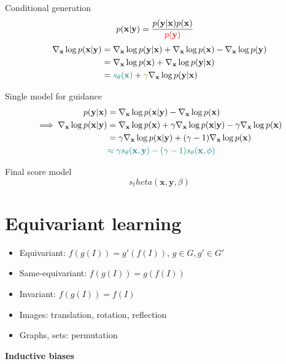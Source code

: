 \documentclass[aspectratio=169,xcolor=dvipsnames]{beamer}
\newcommand{\bx}{\mathbf{x}}
\newcommand{\by}{\mathbf{y}}
\newcommand{\nbx}{\nabla_{\bx}}
\begin{document}
\begin{frame}{Conditional generation}
  \begin{align*}
   p(\bx | \by) &= \frac{p(\by | \bx) p(\bx)}{\textcolor{red}{p(\by)}}
  \end{align*}
  \pause
  \begin{align*}
    \nbx \log p(\bx | \by) &= \nbx \log p(\by | \bx) + \nbx \log p(\bx) - \nbx \log p(\by)\\
                           &= \nbx \log p(\bx) + \nbx \log p(\by | \bx) \\
                           &= \textcolor{teal}{s_\theta(\bx)} + \textcolor{olive}{\gamma} \nbx \log p(\by | \bx)
  \end{align*}
\end{frame}

\begin{frame}{Single model for guidance}
  \begin{align*}
    p(\by | \bx) &= \nbx \log p(\bx | \by) - \nbx \log p(\bx)\\
    \implies  \nbx \log p(\bx | \by) &= \nbx \log p(\bx) + \gamma \nbx \log p(\bx | \by) - \gamma \nbx \log p(\bx) \\
                                     &= \gamma \nbx \log p(\bx | \by) + (\gamma - 1)  \nbx \log p(\bx)\\
                                     &\textcolor{teal}{\approx \gamma s_\theta(\bx, \by) - (\gamma - 1) s_\theta(\bx, \phi)}
  \end{align*}
\end{frame}

\begin{frame}{Final score model}
  \[
  s_theta(\bx, \by, \beta)
  \]
\end{frame}

\section{Equivariant learning}
\begin{frame}{}
  \begin{itemize}
    \item Equivariant: $f(g(I)) = g'(f(I))$, $g \in G, g' \in G'$
    \pause
    \item Same-equivariant: $f(g(I)) = g(f(I))$
    \pause
    \item Invariant: $f(g(I)) = f(I)$
  \end{itemize}

  \pause

  \vspace{0.5cm}
  \begin{itemize}
    \item Images: translation, rotation, reflection
    \item Graphs, sets: permutation
  \end{itemize}

  \pause

  \vspace{1.5cm}
  \centering
  \textbf{Inductive biases}
\end{frame}
\end{document}
